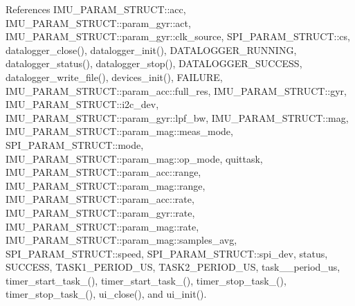 References I\-M\-U\-\_\-\-P\-A\-R\-A\-M\-\_\-\-S\-T\-R\-U\-C\-T\-::acc, I\-M\-U\-\_\-\-P\-A\-R\-A\-M\-\_\-\-S\-T\-R\-U\-C\-T\-::param\-\_\-gyr\-::act, I\-M\-U\-\_\-\-P\-A\-R\-A\-M\-\_\-\-S\-T\-R\-U\-C\-T\-::param\-\_\-gyr\-::clk\-\_\-source, S\-P\-I\-\_\-\-P\-A\-R\-A\-M\-\_\-\-S\-T\-R\-U\-C\-T\-::cs, datalogger\-\_\-close(), datalogger\-\_\-init(), D\-A\-T\-A\-L\-O\-G\-G\-E\-R\-\_\-\-R\-U\-N\-N\-I\-N\-G, datalogger\-\_\-status(), datalogger\-\_\-stop(), D\-A\-T\-A\-L\-O\-G\-G\-E\-R\-\_\-\-S\-U\-C\-C\-E\-S\-S, datalogger\-\_\-write\-\_\-file(), devices\-\_\-init(), F\-A\-I\-L\-U\-R\-E, I\-M\-U\-\_\-\-P\-A\-R\-A\-M\-\_\-\-S\-T\-R\-U\-C\-T\-::param\-\_\-acc\-::full\-\_\-res, I\-M\-U\-\_\-\-P\-A\-R\-A\-M\-\_\-\-S\-T\-R\-U\-C\-T\-::gyr, I\-M\-U\-\_\-\-P\-A\-R\-A\-M\-\_\-\-S\-T\-R\-U\-C\-T\-::i2c\-\_\-dev, I\-M\-U\-\_\-\-P\-A\-R\-A\-M\-\_\-\-S\-T\-R\-U\-C\-T\-::param\-\_\-gyr\-::lpf\-\_\-bw, I\-M\-U\-\_\-\-P\-A\-R\-A\-M\-\_\-\-S\-T\-R\-U\-C\-T\-::mag, I\-M\-U\-\_\-\-P\-A\-R\-A\-M\-\_\-\-S\-T\-R\-U\-C\-T\-::param\-\_\-mag\-::meas\-\_\-mode, S\-P\-I\-\_\-\-P\-A\-R\-A\-M\-\_\-\-S\-T\-R\-U\-C\-T\-::mode, I\-M\-U\-\_\-\-P\-A\-R\-A\-M\-\_\-\-S\-T\-R\-U\-C\-T\-::param\-\_\-mag\-::op\-\_\-mode, quittask, I\-M\-U\-\_\-\-P\-A\-R\-A\-M\-\_\-\-S\-T\-R\-U\-C\-T\-::param\-\_\-acc\-::range, I\-M\-U\-\_\-\-P\-A\-R\-A\-M\-\_\-\-S\-T\-R\-U\-C\-T\-::param\-\_\-mag\-::range, I\-M\-U\-\_\-\-P\-A\-R\-A\-M\-\_\-\-S\-T\-R\-U\-C\-T\-::param\-\_\-acc\-::rate, I\-M\-U\-\_\-\-P\-A\-R\-A\-M\-\_\-\-S\-T\-R\-U\-C\-T\-::param\-\_\-gyr\-::rate, I\-M\-U\-\_\-\-P\-A\-R\-A\-M\-\_\-\-S\-T\-R\-U\-C\-T\-::param\-\_\-mag\-::rate, I\-M\-U\-\_\-\-P\-A\-R\-A\-M\-\_\-\-S\-T\-R\-U\-C\-T\-::param\-\_\-mag\-::samples\-\_\-avg, S\-P\-I\-\_\-\-P\-A\-R\-A\-M\-\_\-\-S\-T\-R\-U\-C\-T\-::speed, S\-P\-I\-\_\-\-P\-A\-R\-A\-M\-\_\-\-S\-T\-R\-U\-C\-T\-::spi\-\_\-dev, status, S\-U\-C\-C\-E\-S\-S, T\-A\-S\-K1\-\_\-\-P\-E\-R\-I\-O\-D\-\_\-\-U\-S, T\-A\-S\-K2\-\_\-\-P\-E\-R\-I\-O\-D\-\_\-\-U\-S, task\-\_\-\_\-period\-\_\-us, timer\-\_\-start\-\_\-task\-\_(), timer\-\_\-start\-\_\-task\-\_(), timer\-\_\-stop\-\_\-task\-\_(), timer\-\_\-stop\-\_\-task\-\_(), ui\-\_\-close(), and ui\-\_\-init().


